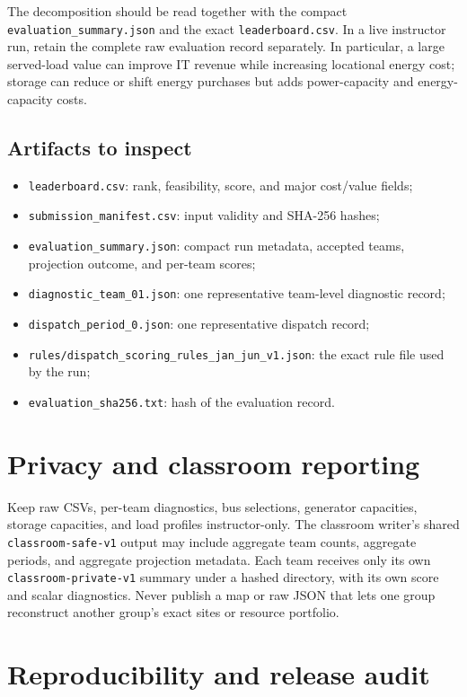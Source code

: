 \documentclass[12pt]{article}
\newcommand{\code}[1]{\texttt{#1}}
\begin{document}
The decomposition should be read together with the compact
\code{evaluation\_summary.json} and the exact \code{leaderboard.csv}. In a
live instructor run, retain the complete raw evaluation record separately. In
particular, a large served-load value can improve
IT revenue while increasing locational energy cost; storage can reduce or shift
energy purchases but adds power-capacity and energy-capacity costs.

\subsection{Artifacts to inspect}
\begin{itemize}[leftmargin=*]
  \item \code{leaderboard.csv}: rank, feasibility, score, and major cost/value fields;
  \item \code{submission\_manifest.csv}: input validity and SHA-256 hashes;
  \item \code{evaluation\_summary.json}: compact run metadata, accepted teams,
  projection outcome, and per-team scores;
  \item \code{diagnostic\_team\_01.json}: one representative team-level
  diagnostic record;
  \item \code{dispatch\_period\_0.json}: one representative dispatch record;
  \item \code{rules/dispatch\_scoring\_rules\_jan\_jun\_v1.json}: the exact
  rule file used by the run;
  \item \code{evaluation\_sha256.txt}: hash of the evaluation record.
\end{itemize}

\section{Privacy and classroom reporting}

Keep raw CSVs, per-team diagnostics, bus selections, generator capacities,
storage capacities, and load profiles instructor-only. The classroom writer's
shared \code{classroom-safe-v1} output may include aggregate team counts,
aggregate periods, and aggregate projection metadata. Each team receives only
its own \code{classroom-private-v1} summary under a hashed directory, with its
own score and scalar diagnostics. Never publish a map or raw JSON that lets one
group reconstruct another group's exact sites or resource portfolio.

\section{Reproducibility and release audit}
\end{document}
